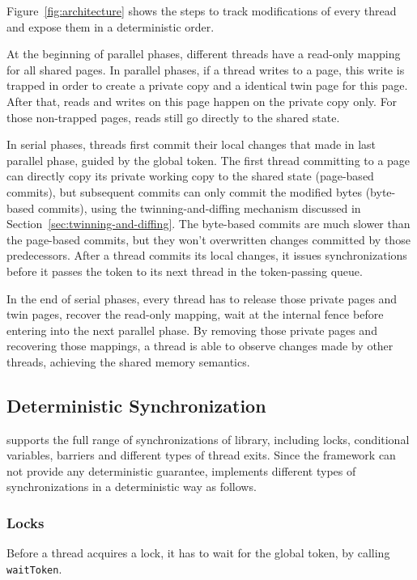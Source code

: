 Figure~\ref{fig:architecture} shows the steps to track modifications of every thread and expose them in a deterministic order.  

At the beginning of parallel phases, different threads have a read-only mapping for all shared pages. In parallel phases, if a thread writes to a page, this write is trapped in order to create a private copy and a identical twin page for this page. After that, reads and writes on this page happen on the private copy only. For those non-trapped pages, reads still go directly to the shared state.  

In serial phases, threads first commit their local changes that made in last parallel phase, guided by the global token.  The first thread  committing to a page can directly copy its private working copy to the shared state (page-based commits), but subsequent commits can only commit the modified bytes (byte-based commits), using the twinning-and-diffing mechanism discussed in Section~\ref{sec:twinning-and-diffing}. The byte-based commits are much slower than the page-based commits, but  they won't overwritten changes committed by those predecessors.  After a thread commits its local changes, it issues synchronizations before it passes the token to its next thread in the token-passing queue. 

In the end of serial phases, every thread has to release those private pages and twin pages, recover the read-only mapping, wait at the internal fence before entering into the next parallel phase. By removing those private pages and recovering those mappings, a thread is able to observe changes made by other threads, achieving the shared memory semantics. 

\subsection{Deterministic Synchronization}
\label{sec:synchronization}

\dthreads{} supports the full range of synchronizations of \pthreads{} library, including locks, conditional variables, barriers and different types of thread exits. Since the \sheriff{} framework can not provide any deterministic guarantee, \dthreads{} implements different types of synchronizations in a deterministic way as follows. 

\subsubsection{Locks}
Before a thread acquires a lock, it has to wait for the global token, by calling \texttt{waitToken}. 


